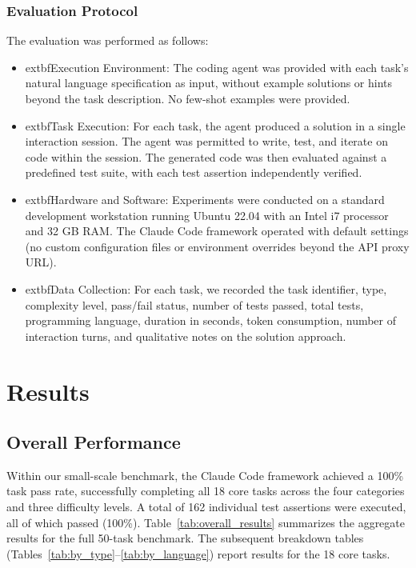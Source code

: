 \documentclass[conference]{IEEEtran}
\begin{document}
\subsubsection{Evaluation Protocol}

The evaluation was performed as follows:

\begin{itemize}[leftmargin=*]
 \item 			extbf{Execution Environment:} The coding agent was provided with each task's natural language specification as input, without example solutions or hints beyond the task description. No few-shot examples were provided.
 \item 			extbf{Task Execution:} For each task, the agent produced a solution in a single interaction session. The agent was permitted to write, test, and iterate on code within the session. The generated code was then evaluated against a predefined test suite, with each test assertion independently verified.
 \item 			extbf{Hardware and Software:} Experiments were conducted on a standard development workstation running Ubuntu 22.04 with an Intel i7 processor and 32 GB RAM. The Claude Code framework operated with default settings (no custom configuration files or environment overrides beyond the API proxy URL).
 \item 			extbf{Data Collection:} For each task, we recorded the task identifier, type, complexity level, pass/fail status, number of tests passed, total tests, programming language, duration in seconds, token consumption, number of interaction turns, and qualitative notes on the solution approach.
\end{itemize}

\section{Results}
\label{sec:results}

\subsection{Overall Performance}

Within our small-scale benchmark, the Claude Code framework achieved a 100\% task pass rate, successfully completing all 18 core tasks across the four categories and three difficulty levels. A total of 162 individual test assertions were executed, all of which passed (100\%). Table~\ref{tab:overall_results} summarizes the aggregate results for the full 50-task benchmark. The subsequent breakdown tables (Tables~\ref{tab:by_type}--\ref{tab:by_language}) report results for the 18 core tasks.
\end{document}
